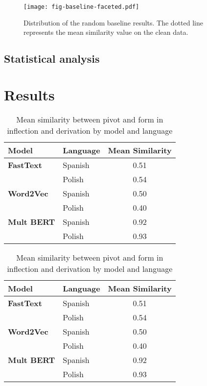 \documentclass[12pt]{article}
\begin{document}
\begin{figure}[p]
\centering
\texttt{[image: fig-baseline-faceted.pdf]}
\caption{Distribution of the random baseline results. The dotted line represents the mean similarity value on the clean data.}
\label{fig:baseline}
\end{figure}

\subsection{Statistical analysis}

\section{Results}

\begin{table}[ht]
\centering
\label{tbl:mean-similarity}
\begin{minipage}[t]{0.48\textwidth}
\small
\centering
{}
\begin{tabular}{llc}
\toprule
\textbf{Model} & \textbf{Language} & \textbf{Mean Similarity} \\
\midrule
\textbf{FastText}  & Spanish & 0.51 \\
                   & Polish  & 0.54 \\
\textbf{Word2Vec}  & Spanish & 0.50 \\
                   & Polish  & 0.40 \\
\textbf{Mult BERT} & Spanish & 0.92 \\
                   & Polish  & 0.93 \\
\bottomrule
\end{tabular}
\end{minipage}
\hfill
\begin{minipage}[t]{0.48\textwidth}
\small
\centering
{}
\begin{tabular}{llc}
\toprule
\textbf{Model} & \textbf{Language} & \textbf{Mean Similarity} \\
\midrule
\textbf{FastText}  & Spanish & 0.51 \\
                   & Polish  & 0.54 \\
\textbf{Word2Vec}  & Spanish & 0.50 \\
                   & Polish  & 0.40 \\
\textbf{Mult BERT} & Spanish & 0.92 \\
                   & Polish  & 0.93 \\
\bottomrule
\end{tabular}
\end{minipage}
\caption{Mean similarity between pivot and form in inflection and derivation by model and language}
\end{table}
\end{document}
